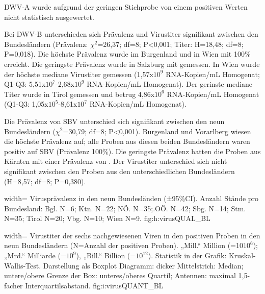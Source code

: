 DWV-A wurde aufgrund der geringen Stichprobe von einem positiven Werten nicht statistisch ausgewertet.

Bei DWV-B unterschieden sich Prävalenz und Virustiter signifikant zwischen den Bundesländern (Prävalenz: $\chi^2$=26,37; df=8; P<0,001; Titer: H=18,48; df=8; P=0,018). Die höchste Prävalenz wurde im Burgenland und in Wien mit 100\% erreicht. Die geringste Prävalenz wurde in Salzburg mit  gemessen. In Wien wurde der höchste mediane Virustiter gemessen (1,57x$10^9$ RNA-Kopien/\si{\milli\liter} Homogenat; Q1-Q3: 5,51x$10^7$-2,68x$10^9$ RNA-Kopien/\si{\milli\liter} Homogenat). Der gerinste mediane Titer wurde in Tirol gemessen und betrug 4,86x$10^6$ RNA-Kopien/\si{\milli\liter} Homogenat (Q1-Q3: 1,05x$10^5$-8,61x$10^7$ RNA-Kopien/\si{\milli\liter} Homogenat).


Die Prävalenz von SBV unterschied sich signifikant zwischen den neun Bundesländern ($\chi^2$=30,79; df=8; P<0,001). Burgenland und Vorarlberg wiesen die höchste Prävalenz auf; alle Proben aus diesen beiden Bundesländern waren positiv auf SBV (Prävalenz 100\%). Die geringste Prävalenz hatten die Proben aus Kärnten mit einer Prävalenz von . Der Virustiter unterschied sich nicht signifikant zwischen den Proben aus den unterschiedlichen Bundesländern (H=8,57; df=8; P=0,380).

  {width=\textwidth} %
  {Virusprävalenz in den neun Bundesländen (±95\%CI). Anzahl Stände pro Bundesland: Bgl. N=6; Ktn. N=22; NÖ. N=35;.OÖ. N=42; Sbg. N=14; Stm. N=35; Tirol N=20; Vbg. N=10; Wien N=9.} %
  {} %
  {fig:h:virusQUAL_BL} %
  
  
  {width=\textwidth} %
  {Virustiter der sechs nachgewiesenen Viren in den positiven Proben in den neun Bundesländern (N=Anzahl der positiven Proben). „Mill.“ Million (=10$10^6$); „Mrd.“ Milliarde (=$10^9$), „Bill.“ Billion (=$10^{12}$). Statistik in der Grafik: Kruskal-Wallis-Test. Darstellung als Boxplot Diagramm: dicker Mittelstrich: Median; untere/obere Grenze der Box: unteres/oberes Quartil; Antennen: maximal 1,5-facher Interquartilsabstand.} %
  {} %
  {fig:i:virusQUANT_BL} %






